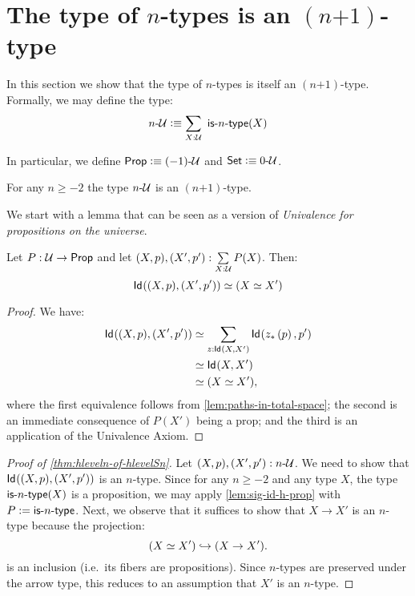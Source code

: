 \section{The type of \texorpdfstring{$n$}{n}-types is an \texorpdfstring{$(n\mbox{+}1)$}{(n+1)}-type}

In this section we show that the type of $n$-types is itself an $(n\mbox{+}1)$-type. Formally, we may define the type:
 \[n\mbox{-}\type \defeq \sum_{X : \type} \ \istype{n}(X) \]

In particular, we define $\mathsf{Prop} \vcentcolon\equiv (-1)\mbox{-}\mathcal{U}$ and $\mathsf{Set} \vcentcolon\equiv 0\mbox{-}\mathcal{U}$.

\begin{thm}\label{thm:hleveln-of-hlevelSn}
 For any $n \geq -2$ the type $n\mbox{-}\mathcal{U}$ is an $(n\mbox{+}1)$-type.
\end{thm}

We start with a lemma that can be seen as a version of {\em Univalence for propositions on the universe}.

\begin{lem}\label{lem:sig-id-h-prop}
 Let $P : \mathcal{U} \to \mathsf{Prop}$ and let $(X, p), (X', p') : \sum\limits_{X : \mathcal{U}} P(X)$. Then:
 \[ \mathsf{Id}_{}((X, p),(X', p'))  \simeq (X \simeq X')\]
\end{lem}

\begin{proof}
 We have:
 \begin{equation*}\begin{split}
 \mathsf{Id}_{}((X, p),(X', p')) & \simeq \sum_{z : \mathsf{Id}_{}(X,X')} \mathsf{Id}_{}({z}_{*}\left({p}\right),p') \\
  & \simeq \mathsf{Id}_{}(X,X') \\
  & \simeq (X \simeq X'),
 \end{split}
 \end{equation*}
 where the first equivalence follows from \ref{lem:paths-in-total-space}; the second is an immediate consequence of $P(X')$ being a prop; and the third is an application of the Univalence Axiom.
\end{proof}

\begin{proof}[Proof of \autoref{thm:hleveln-of-hlevelSn}]
 Let $(X, p), (X', p') : n\mbox{-}\mathcal{U}$. We need to show that $\mathsf{Id}_{}((X, p),(X', p'))$ is an $n$-type. Since for any $n \geq -2$ and any type $X$, the type $\mathsf{is}\mbox{-}{n}\mbox{-}\mathsf{type}(X)$ is a proposition, we may apply \autoref{lem:sig-id-h-prop} with $P := \mathsf{is}\mbox{-}{n}\mbox{-}\mathsf{type}$. Next, we observe that it
suffices to show that $X \rightarrow X'$ is an $n$-type because the projection:
 \[(X \simeq X') \hookrightarrow (X \rightarrow X').\]
 is an inclusion (i.e.~its fibers are propositions). Since $n$-types are preserved under the arrow type, this reduces to an assumption that $X'$ is an $n$-type.
\end{proof} 

